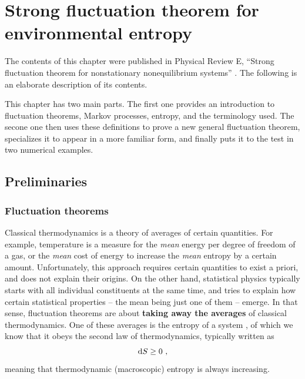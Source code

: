 \chapter{Strong fluctuation theorem for environmental entropy}
\label{chap:thingie}

The contents of this chapter were published in Physical Review E, ``Strong fluctuation theorem for nonstationary nonequilibrium systems'' \cite{thingie-paper}. The following is an elaborate description of its contents.

This chapter has two main parts. The first one provides an introduction to fluctuation theorems, Markov processes, entropy, and the terminology used. The secone one then uses these definitions to prove a new general fluctuation theorem, specializes it to appear in a more familiar form, and finally puts it to the test in two numerical examples.


\section{Preliminaries}



\subsection{Fluctuation theorems}

Classical thermodynamics is a theory of averages of certain quantities. For example, temperature is a measure for the \emph{mean} energy per degree of freedom of a gas, or the \emph{mean} cost of energy to increase the \emph{mean} entropy by a certain amount. Unfortunately, this approach requires certain quantities to exist a priori, and does not explain their origins. On the other hand, statistical physics typically starts with all individual constituents at the same time, and tries to explain how certain statistical properties -- the mean being just one of them -- emerge. In that sense, fluctuation theorems are about \textbf{taking away the averages} of classical thermodynamics. One of these averages is the entropy of a system , of which we know that it obeys the second law of thermodynamics, typically written as
%
\begin{equation}
	\label{eqn:2nd_law_classical}
	\mathrm{d} S \geq 0 ~,
\end{equation}
%
meaning that thermodynamic (macroscopic) entropy is always increasing.

